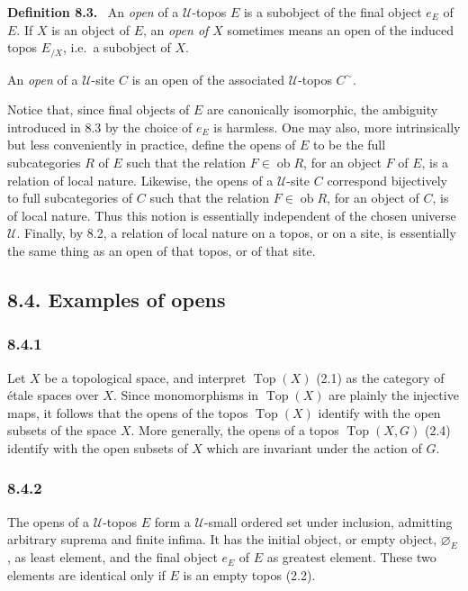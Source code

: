 \documentclass[11pt]{article}
\newcommand{\U}{\mathcal{U}}
\newcommand{\Top}{\operatorname{Top}}
\newcommand{\ob}{\operatorname{ob}}
\newcommand{\ie}{i.e.}
\newenvironment{statement}[1]{\par\medskip\noindent\textbf{#1.}\ }{\par\medskip}
\begin{document}
\begin{statement}{Definition 8.3}
An \emph{open} of a \(\U\)-topos \(E\) is a subobject of the final object \(e_E\) of \(E\). If \(X\) is an object of \(E\), an \emph{open of \(X\)} sometimes means an open of the induced topos \(E_{/X}\), \ie\ a subobject of \(X\).

An \emph{open} of a \(\U\)-site \(C\) is an open of the associated \(\U\)-topos \(C^{\sim}\).
\end{statement}

Notice that, since final objects of \(E\) are canonically isomorphic, the ambiguity introduced in 8.3 by the choice of \(e_E\) is harmless. One may also, more intrinsically but less conveniently in practice, define the opens of \(E\) to be the full subcategories \(R\) of \(E\) such that the relation \(F\in\ob R\), for an object \(F\) of \(E\), is a relation of local nature. Likewise, the opens of a \(\U\)-site \(C\) correspond bijectively to full subcategories of \(C\) such that the relation \(F\in\ob R\), for an object of \(C\), is of local nature. Thus this notion is essentially independent of the chosen universe \(\U\). Finally, by 8.2, a relation of local nature on a topos, or on a site, is essentially the same thing as an open of that topos, or of that site.

\subsection*{8.4. Examples of opens}

\subsubsection*{8.4.1}
Let \(X\) be a topological space, and interpret \(\Top(X)\) (2.1) as the category of \'{e}tale spaces over \(X\). Since monomorphisms in \(\Top(X)\) are plainly the injective maps, it follows that the opens of the topos \(\Top(X)\) identify with the open subsets of the space \(X\). More generally, the opens of a topos \(\Top(X,G)\) (2.4) identify with the open subsets of \(X\) which are invariant under the action of \(G\).

\subsubsection*{8.4.2}
The opens of a \(\U\)-topos \(E\) form a \(\U\)-small ordered set under inclusion, admitting arbitrary suprema and finite infima. It has the initial object, or empty object, \(\varnothing_E\), as least element, and the final object \(e_E\) of \(E\) as greatest element. These two elements are identical only if \(E\) is an empty topos (2.2).
\end{document}
